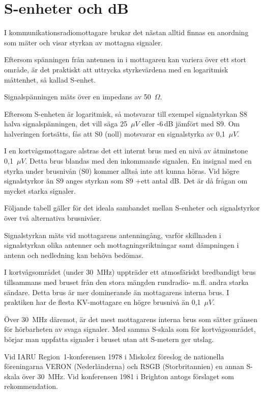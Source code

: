 \chapter{S-enheter och dB}
\label{s-enhet}

I kommunikationsradiomottagare brukar det nästan alltid finnas en anordning som
mäter och visar styrkan av mottagna signaler.

Eftersom spänningen från antennen in i mottagaren kan variera över ett stort
område, är det praktiskt att uttrycka styrkevärdena med en logaritmisk
måttenhet, så kallad S-enhet.

Signalspänningen mäts över en impedans av 50~\(\Omega\).

Eftersom S-enheten är logaritmisk, så motsvarar till exempel signalstyrkan S8
halva signalspänningen, det vill säga 25~\(\mu V\) eller -6\,dB jämfört med S9.
Om halveringen fortsätts, fås att S0 (noll) motsvarar en signalstyrka av 0,1~\(\mu V\).

I en kortvågsmottagare alstras det ett internt brus med en nivå av
åtminstone 0,1~\(\mu V\).
Detta brus blandas med den inkommande signalen.
En insignal med en styrka under brusnivån (S0) kommer alltså inte att
kunna höras.
Vid högre signalstyrkor än S9 anges styrkan som S9 +ett antal dB.
Det är då frågan om mycket starka signaler.

Följande tabell gäller för det ideala sambandet mellan S-enheter och
signalstyrkor över två alternativa brusnivåer.

\newpage

Signalstyrkan mäts vid mottagarens antenningång, varför skillnaden i
signalstyrkan olika antenner och mottagningsriktningar samt dämpningen
i antenn och nedledning kan behöva bedömas.

I kortvågsområdet (under 30~MHz) uppträder ett atmosfäriskt bredbandigt brus
tillsammans med bruset från den stora mängden rundradio- m.fl. andra starka
sändare.
Detta brus är mer dominerande än mottagarens interna brus.
I praktiken har de flesta KV-mottagare en högre brusnivå än 0,1~\(\mu V\).

Över 30~MHz däremot, är det mest mottagarens interna brus som sätter
gränsen för hörbarheten av svaga signaler.
Med samma S-skala som för kortvågsområdet, börjar man uppfatta signaler i
bruset utan att S-metern ger utslag.

Vid IARU Region~1-konferensen 1978 i Miskolcz föreslog de nationella
föreningarna VERON (Nederländerna) och RSGB (Storbritannien) en annan
S-skala över 30~MHz.
Vid konferensen 1981 i Brighton antogs förslaget som rekommendation.

